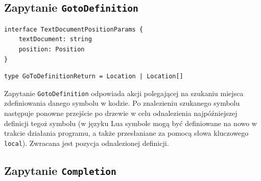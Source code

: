 \subsection{Zapytanie \texttt{GotoDefinition}}
\begin{lstlisting}[title=Struktura argumentu zapytania]
interface TextDocumentPositionParams {
    textDocument: string
    position: Position
}
\end{lstlisting}

\begin{lstlisting}[title=Struktura odpowiedzi]
type GoToDefinitionReturn = Location | Location[]
\end{lstlisting}
Zapytanie \texttt{GotoDefinition} odpowiada akcji polegającej na szukaniu miejsca zdefiniowania danego symbolu w kodzie. Po znalezieniu szukanego symbolu następuje ponowne przejście po drzewie w celu odnalezienia najpóźniejszej definicji tegoż symbolu (w języku Lua symbole mogą być definiowane na nowo w trakcie działania programu, a także przesłaniane za pomocą słowa kluczowego \texttt{local}). Zwracana jest pozycja odnalezionej definicji.

\subsection{Zapytanie \texttt{Completion}}

